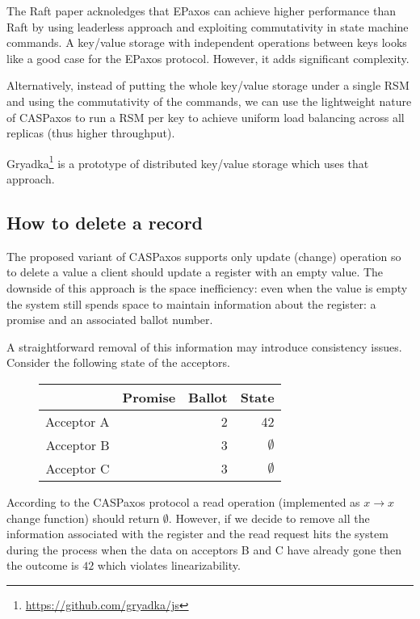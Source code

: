 \documentclass[12pt]{article}
\theoremstyle{definition}
\begin{document}
The Raft paper acknoledges\cite{raft} that EPaxos\cite{epaxos} can achieve higher performance than Raft by using leaderless approach and exploiting commutativity in state machine commands. A key/value storage with independent operations between keys looks like a good case for the EPaxos protocol. However, it adds significant complexity.

Alternatively, instead of putting the whole key/value storage under a single RSM and using the commutativity of the commands, we can use the lightweight nature of CASPaxos to run a RSM per key to achieve uniform load balancing across all replicas (thus higher throughput).

Gryadka\footnote{\href{https://github.com/gryadka/js}{https://github.com/gryadka/js}} is a prototype of distributed key/value storage which uses that approach.

\subsection{How to delete a record}

The proposed variant of CASPaxos supports only update (change) operation so to delete a value a client should update a register with an empty value. The downside of this approach is the space inefficiency: even when the value is empty the system still spends space to maintain information about the register: a promise and an associated ballot number.

A straightforward removal of this information may introduce consistency issues. Consider the following state of the acceptors.

\begin{figure}[!h]
  \centering
  \begin{tabular}{ r|r|r|r }
    & Promise & Ballot & State \\ \hline
    Acceptor A && 2 & 42 \\
    Acceptor B && 3 & $\emptyset$ \\
    Acceptor C && 3 & $\emptyset$ \\
  \end{tabular}
\end{figure}

According to the CASPaxos protocol a read operation (implemented as $x \to x$ change function) should return $\emptyset$. However, if we decide to remove all the information associated with the register and the read request hits the system during the process when the data on acceptors B and C have already gone then the outcome is $42$ which violates linearizability.
\end{document}
